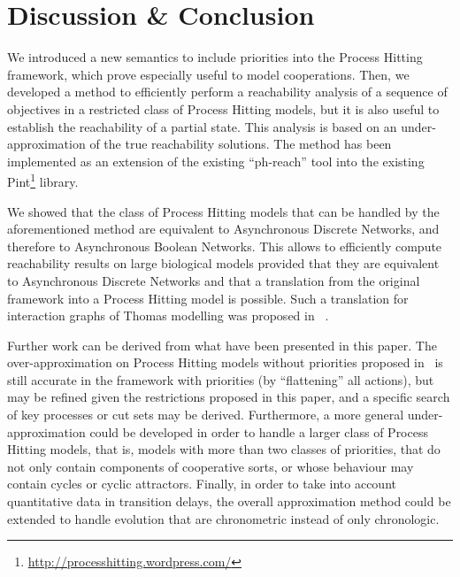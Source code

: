 \section{Discussion \& Conclusion}\label{sec:ccl}

We introduced a new semantics to include priorities into the Process Hitting framework, which prove especially useful to model cooperations.
Then, we developed a method to efficiently perform a reachability analysis of a sequence of objectives in a restricted class of Process Hitting models,
but it is also useful to establish the reachability of a partial state.
This analysis is based on an under-approximation of the true reachability solutions.
The method has been implemented as an extension of the existing “ph-reach” tool into the existing Pint\footnote{\url{http://processhitting.wordpress.com/}} library.

We showed that the class of Process Hitting models that can be handled by the aforementioned method are equivalent to Asynchronous Discrete Networks, and therefore to Asynchronous Boolean Networks.
This allows to efficiently compute reachability results on large biological models provided that they are equivalent to Asynchronous Discrete Networks and that a translation from the original framework into a Process Hitting model is possible.
Such a translation for interaction graphs of Thomas modelling was proposed in~\cite{PMR10-TCSB} .

Further work can be derived from what have been presented in this paper.
The over-approximation on Process Hitting models without priorities proposed in~\cite{PMR12-MSCS}
is still accurate in the framework with priorities (by “flattening” all actions),
but may be refined given the restrictions proposed in this paper,
and a specific search of key processes or cut sets may be derived.
Furthermore, a more general under-approximation could be developed in order to handle a larger class of Process Hitting models, that is,
models with more than two classes of priorities, that do not only contain components of cooperative sorts, or whose behaviour may contain cycles or cyclic attractors.
Finally, in order to take into account quantitative data in transition delays, the overall approximation method could be extended to handle evolution that are chronometric instead of only chronologic.
